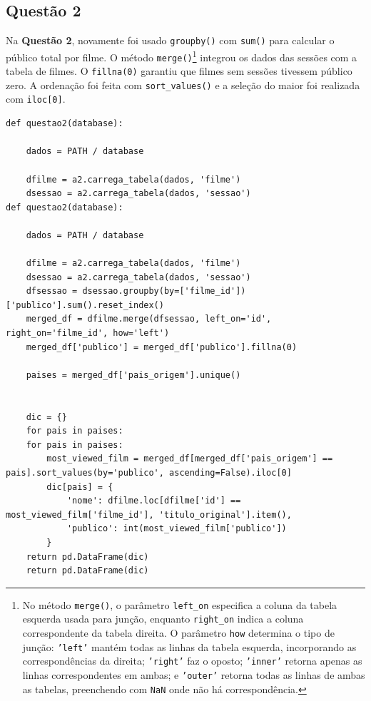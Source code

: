 \documentclass{article}
\begin{document}
\subsection*{Questão 2}
Na \textbf{Questão 2}, novamente foi usado \texttt{groupby()} com \texttt{sum()} para calcular o público total por filme. O método \texttt{merge()}\footnote{No método \texttt{merge()}, o parâmetro \texttt{left\_on} especifica a coluna da tabela esquerda usada para junção, enquanto \texttt{right\_on} indica a coluna correspondente da tabela direita. O parâmetro \texttt{how} determina o tipo de junção: \texttt{'left'} mantém todas as linhas da tabela esquerda, incorporando as correspondências da direita; \texttt{'right'} faz o oposto; \texttt{'inner'} retorna apenas as linhas correspondentes em ambas; e \texttt{'outer'} retorna todas as linhas de ambas as tabelas, preenchendo com \texttt{NaN} onde não há correspondência.} integrou os dados das sessões com a tabela de filmes. O \texttt{fillna(0)} garantiu que filmes sem sessões tivessem público zero. A ordenação foi feita com \texttt{sort\_values()} e a seleção do maior foi realizada com \texttt{iloc[0]}.
\linespread{1}
\begin{lstlisting}
def questao2(database):

    dados = PATH / database

    dfilme = a2.carrega_tabela(dados, 'filme')
    dsessao = a2.carrega_tabela(dados, 'sessao')
def questao2(database):

    dados = PATH / database

    dfilme = a2.carrega_tabela(dados, 'filme')
    dsessao = a2.carrega_tabela(dados, 'sessao')
    dfsessao = dsessao.groupby(by=['filme_id'])['publico'].sum().reset_index()
    merged_df = dfilme.merge(dfsessao, left_on='id', right_on='filme_id', how='left')
    merged_df['publico'] = merged_df['publico'].fillna(0)
    
    paises = merged_df['pais_origem'].unique()
    
    
    dic = {}
    for pais in paises:        
    for pais in paises:        
        most_viewed_film = merged_df[merged_df['pais_origem'] == pais].sort_values(by='publico', ascending=False).iloc[0]
        dic[pais] = {
            'nome': dfilme.loc[dfilme['id'] == most_viewed_film['filme_id'], 'titulo_original'].item(),
            'publico': int(most_viewed_film['publico'])
        }
    return pd.DataFrame(dic) 
    return pd.DataFrame(dic) 
\end{lstlisting}

\linespread{1.5}
\pagebreak
\end{document}
